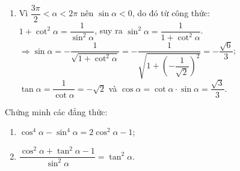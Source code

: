 \begin{bt}
{\begin{enumerate}
			      $\Rightarrow\cos\alpha=-\dfrac{1}{\sqrt{1+\tan^2\alpha}}=-\dfrac{1}{\sqrt{1+(\sqrt{5})^2}}=-\dfrac{\sqrt{6}}{6}$;\\ $\cot\alpha=\dfrac{1}{\tan\alpha}=\dfrac{\sqrt{5}}{5}$ và $\sin\alpha=\tan\alpha\cdot\cos\alpha=-\dfrac{\sqrt{30}}{6}$.
			\item
			      Vì $\dfrac{3\pi}{2}<\alpha<2\pi$ nên $\sin\alpha<0$, do đó từ công thức:\\
			      $1+\cot^2\alpha=\dfrac{1}{\sin^2\alpha}$, suy ra $\sin^2\alpha=\dfrac{1}{1+\cot^2\alpha}$.\\
			      $\Rightarrow\sin\alpha=-\dfrac{1}{\sqrt{1+\cot^2\alpha}}=-\dfrac{1}{\sqrt{1+\left(-\dfrac{1}{\sqrt{2}}\right)^2}}=-\dfrac{\sqrt{6}}{3}$;\\ $\tan\alpha=\dfrac{1}{\cot\alpha}=-\sqrt{2}$ và $\cos\alpha=\cot\alpha\cdot\sin\alpha=\dfrac{\sqrt{3}}{3}$.
		\end{enumerate}
	}
\end{bt}

\begin{bt}%
	Chứng minh các đẳng thức:
	\begin{enumerate}
		\item $\cos^4\alpha-\sin^4\alpha=2\cos^2\alpha-1$;
		\item $\dfrac{\cos^2\alpha+\tan^2\alpha-1}{\sin^2\alpha}=\tan^2\alpha$.
	\end{enumerate}
\end{bt}

